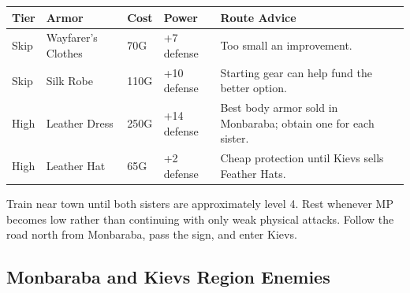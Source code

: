\documentclass[
  american,
  10pt,
  letterpaper,
  oneside,
  open=any]{scrreprt}
\newcounter{none} %
\newenvironment{guidetable}{%
  \small\setstretch{1.0}%
  \setlength{\tabcolsep}{4pt}%
  \setlength{\LTpre}{8pt}\setlength{\LTpost}{10pt}%
  \renewcommand{\arraystretch}{1.16}%
}{ }
\begin{document}
\begin{guidetable}

{\def\LTcaptype{none} %
\begin{longtable}[]{@{}
  >{\raggedright\arraybackslash}p{}
  >{\raggedright\arraybackslash}p{}
  >{\raggedleft\arraybackslash}p{}
  >{\raggedleft\arraybackslash}p{}
  >{\raggedright\arraybackslash}p{}@{}}
\toprule\noalign{}
\begin{minipage}[b]{\linewidth}\raggedright
\color{GuideGreen}\bfseries Tier
\end{minipage} & \begin{minipage}[b]{\linewidth}\raggedright
\color{GuideGreen}\bfseries Armor
\end{minipage} & \begin{minipage}[b]{\linewidth}\raggedleft
\color{GuideGreen}\bfseries Cost
\end{minipage} & \begin{minipage}[b]{\linewidth}\raggedleft
\color{GuideGreen}\bfseries Power
\end{minipage} & \begin{minipage}[b]{\linewidth}\raggedright
\color{GuideGreen}\bfseries Route Advice
\end{minipage} \\
\midrule\noalign{}
\endhead
\bottomrule\noalign{}
\endlastfoot
Skip & Wayfarer's Clothes & 70G & +7 defense & Too small an
improvement. \\
Skip & Silk Robe & 110G & +10 defense & Starting gear can help fund the
better option. \\
High & Leather Dress & 250G & +14 defense & Best body armor sold in
Monbaraba; obtain one for each sister. \\
High & Leather Hat & 65G & +2 defense & Cheap protection until Kievs
sells Feather Hats. \\
\end{longtable}
}

\end{guidetable}

Train near town until both sisters are approximately level 4. Rest
whenever MP becomes low rather than continuing with only weak physical
attacks. Follow the road north from Monbaraba, pass the sign, and enter
Kievs.

\subsection{Monbaraba and Kievs Region
Enemies}\label{monbaraba-and-kievs-region-enemies}
\end{document}
